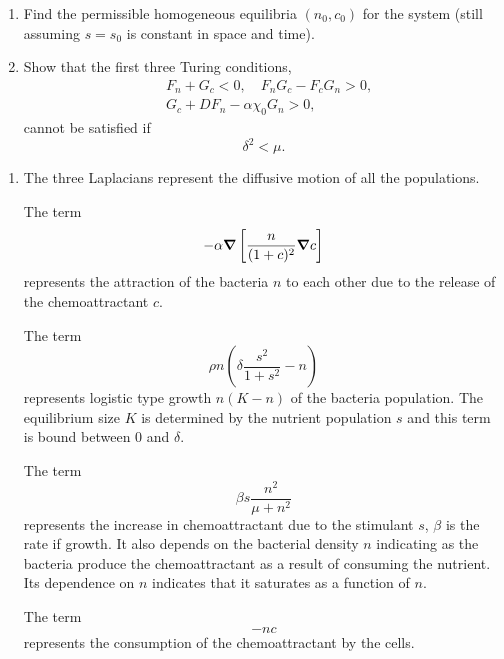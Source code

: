 \documentclass[a4paper, 12pt]{article}
\begin{document}
\begin{enumerate}[label={\bf \arabic{*}.\;}, ref={\arabic{*}},itemsep=3ex, left=0ex]
{\begin{enumerate}[label=(\alph*)]
        \item Find the permissible homogeneous equilibria $(n_0,c_0)$ for the system (still assuming $s=s_0$ is constant in space and time).
        \item Show that the first three Turing conditions,
          \begin{align*}
            &F_n + G_c <0, \quad F_n G_c - F_cG_n >0,\\
            &G_c + D F_n -\alpha\chi_0 G_n >0,
          \end{align*}
          cannot be satisfied if
          \begin{equation}
            \delta^2<\mu.
          \end{equation}

      \end{enumerate}
    }
    {
      \begin{enumerate}
        \item{
            The three Laplacians represent the diffusive motion of all the populations.

            The term
            \begin{equation}
              - \alpha\boldsymbol{\nabla}\left[\frac{n}{(1+c)^2}\boldsymbol{\nabla} c\right]
            \end{equation}
            represents the attraction of  the bacteria $n$ to each other due to the release of the chemoattractant $c$.

            The term
            \begin{equation}
              \rho n \left(\delta\frac{s^2}{1+s^2} - n\right)
            \end{equation}
            represents logistic type growth $n(K-n)$ of the bacteria population. The equilibrium size $K$ is determined by the nutrient population $s$ and this term is bound between $0$ and $\delta$.

            The term
            \begin{equation}
              \beta s\frac{n^2}{\mu + n^2}
            \end{equation}
            represents the increase in chemoattractant due to the stimulant $s$, $\beta$ is the rate if growth. It also depends on the bacterial density $n$ indicating as the bacteria produce the chemoattractant as a result of consuming the nutrient. Its dependence on $n$ indicates that it saturates as a function of $n$.

            The term
            \begin{equation}
              - n c
            \end{equation}
            represents the consumption of the chemoattractant by the cells.

}
\end{enumerate}}
\end{enumerate}
\end{document}
